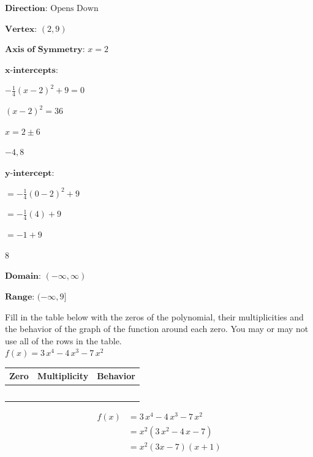 \documentclass[11pt]{exam}
\begin{document}
\begin{questions}
\begin{solution}
\(\textbf{Direction: } \text{Opens Down}\) 

 \(\textbf{Vertex: } (2, 9)\) 

 \(\textbf{Axis of Symmetry: } x = 2\) 

 \(\textbf{x-intercepts:}\) 

 \(-\frac{1}{4}(x - 2)^2 +9 = 0\) 

 \((x - 2)^2 = 36\) 

 \(x = 2 \pm 6\) 

 \(\boxed{ -4, 8 }\) 

 \(\textbf{y-intercept:}\) 

 \(= -\frac{1}{4}(0 - 2)^2 +9\) 

 \(= -\frac{1}{4}(4) +9\) 

 \(= -1 +9\) 

 \(\boxed{ 8 }\) 

 \(\textbf{Domain: } (-\infty, \infty)\) 

 \(\textbf{Range: } (-\infty, 9]\)
\end{solution}

\label{exact-endocc}
\newpage

\headerbox{\ocd}
\label{exact-startocd}

\question[5] Fill in the table below with the zeros of the polynomial, their multiplicities and the behavior of the graph of the function around each zero. You may or may not use all of the rows in the table.\\

\(\displaystyle{ f(x) = 3 \, x^{4} - 4 \, x^{3} - 7 \, x^{2} }\)

\renewcommand{\arraystretch}{3}
\begin{tabular}{|p{20mm}|p{25mm}|p{20mm}|}\hline
\textbf{Zero} & \textbf{Multiplicity} & \textbf{Behavior}\\ \hline
 & & \\ \hline
 & & \\ \hline
 & & \\ \hline
 & & \\ \hline
 & & \\ \hline
\end{tabular}

\begin{solution}
\[\begin{aligned} f(x) &= 3 \, x^{4} - 4 \, x^{3} - 7 \, x^{2} \\ &= x^2(3 \, x^{2} - 4 \, x - 7) \\ &= x^2(3x - 7)(x + 1) \end{aligned}\]


\end{solution}
\end{questions}
\end{document}
